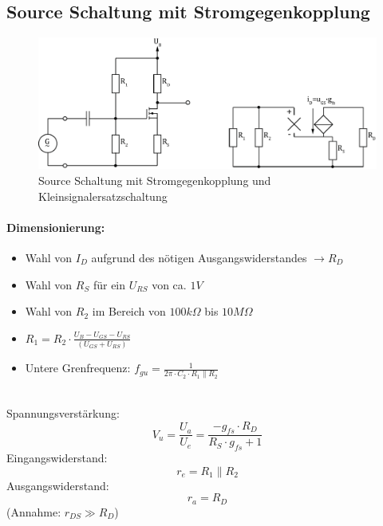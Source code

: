 



\subsection{Source Schaltung mit Stromgegenkopplung}
\begin{figure}[h!]
	\centering
	\includegraphics[width = \linewidth]{../fig/fet_source_i.pdf}
	\caption{Source Schaltung mit Stromgegenkopplung und Kleinsignalersatzschaltung}
	\label{fet:sourceschaltung_i}
\end{figure}
\noindent
\paragraph{Dimensionierung:}
\begin{itemize}
	\item Wahl von $I_D$ aufgrund des nötigen Ausgangswiderstandes $\rightarrow R_D$
	\item Wahl von $R_S$ für ein $U_{RS}$ von ca. $1V$
	\item Wahl von $R_2$ im Bereich von $100k\Omega$ bis $10M\Omega$
	\item $R_1 = R_2 \cdot \frac{U_B - U_{GS} - U_{RS}}{(U_{GS}+U_{RS})}$
	\item Untere Grenfrequenz: $f_{gu} = \frac{1}{2\pi \cdot C_2 \cdot R_1 \parallel R_2}$
\end{itemize}
\noindent\\
Spannungsverstärkung:
\[
	V_u = \frac{U_a}{U_e} = \frac{-g_{fs} \cdot R_D}{R_S \cdot g_{fs} + 1}
\]
Eingangswiderstand:
\[
	r_e = R_1 \parallel R_2
\]
Ausgangswiderstand:
\[
	r_a = R_D
\]
(Annahme: $r_{DS} \gg R_D$)
